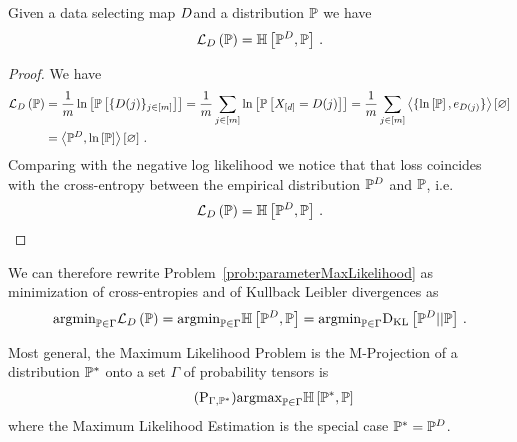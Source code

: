 \begin{theorem}\label{the:lossCentropy}
	Given a data selecting map $D$and a distribution $\mathbb{P}$ we have
	\begin{align}
		\lossof{\probtensor} =  \centropyof{\empdistribution}{\probtensor} \, . %
	\end{align}
\end{theorem}
\begin{proof}
	We have
	\begin{align*}
		\mathcal{L}_{D}\left(\mathbb{P}\right) 
		& = \frac{1}{m} \ln \left[ \mathbb{P}\left[\{D(j)\}_{j\in[m]}\right] \right]
		= \frac{1}{m} \sum_{j\in[m]} \ln \left[ \mathbb{P}\left[X_{[d]} =D(j)\right] \right]
		= \frac{1}{m} \sum_{j\in[m]} \left\langle \{\ln \left[ \mathbb{P} \right],e_{D(j)}\}\right\rangle \left[ \varnothing \right] \\
		& = \left\langle \mathbb{P}^{D},\ln \left[ \mathbb{P} \right]\right\rangle \left[ \varnothing \right] \, .
	\end{align*}
	Comparing with the negative log likelihood we notice that that loss coincides with the cross-entropy between the empirical distribution $\mathbb{P}^{D}$ and $\mathbb{P}$, i.e.
		\[ \mathcal{L}_{D}\left(\mathbb{P}\right) = \mathbb{H}\left[\mathbb{P}^{D},\mathbb{P}\right] \, . \]
\end{proof}



We can therefore rewrite Problem~\ref{prob:parameterMaxLikelihood} as minimization of cross-entropies and of Kullback Leibler divergences as
\begin{align*}
	\mathrm{argmin}_{\mathbb{P}\in\Gamma} \mathcal{L}_{D}\left(\mathbb{P}\right) 
	= \mathrm{argmin}_{\mathbb{P}\in\Gamma} \mathbb{H}\left[\mathbb{P}^{D},\mathbb{P}\right] 
	= \mathrm{argmin}_{\mathbb{P}\in\Gamma} \mathrm{D}_{\mathrm{KL}}\left[ \mathbb{P}^{D} || \mathbb{P} \right] \, .
\end{align*}
	


Most general, the Maximum Likelihood Problem is the M-Projection of a distribution $\mathbb{P}^*$ onto a set $\Gamma$ of probability tensors is
\begin{align}\tag{$\mathrm{P}_{\Gamma, \gendistribution}$}\label{prob:mProjection}
	\argmax_{\probtensor\in\Gamma} \centropyof{\gendistribution}{\probtensor} 
\end{align}
where the Maximum Likelihood Estimation is the special case $\mathbb{P}^*=\mathbb{P}^{D}$.


